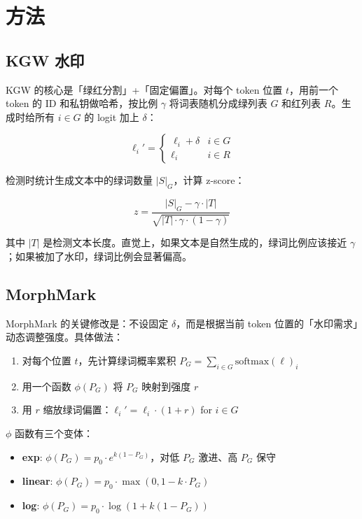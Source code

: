 \documentclass[11pt,a4paper]{article}
\begin{document}
\section{方法}

\subsection{KGW 水印}

KGW 的核心是「绿红分割」+「固定偏置」。对每个 token 位置 $t$，用前一个 token 的 ID 和私钥做哈希，按比例 $\gamma$ 将词表随机分成绿列表 $G$ 和红列表 $R$。生成时给所有 $i \in G$ 的 logit 加上 $\delta$：

\begin{equation}
\ell_i' = \begin{cases}
\ell_i + \delta & i \in G \\
\ell_i & i \in R
\end{cases}
\end{equation}

检测时统计生成文本中的绿词数量 $|S|_G$，计算 z-score：

\begin{equation}
z = \frac{|S|_G - \gamma \cdot |T|}{\sqrt{|T| \cdot \gamma \cdot (1-\gamma)}}
\end{equation}

其中 $|T|$ 是检测文本长度。直觉上，如果文本是自然生成的，绿词比例应该接近 $\gamma$；如果被加了水印，绿词比例会显著偏高。

\subsection{MorphMark}

MorphMark 的关键修改是：不设固定 $\delta$，而是根据当前 token 位置的「水印需求」动态调整强度。具体做法：

\begin{enumerate}[nosep]
  \item 对每个位置 $t$，先计算绿词概率累积 $P_G = \sum_{i \in G} \text{softmax}(\ell)_i$
  \item 用一个函数 $\phi(P_G)$ 将 $P_G$ 映射到强度 $r$
  \item 用 $r$ 缩放绿词偏置：$\ell_i' = \ell_i \cdot (1 + r)$ for $i \in G$
\end{enumerate}

$\phi$ 函数有三个变体：
\begin{itemize}[nosep]
  \item \textbf{exp}: $\phi(P_G) = p_0 \cdot e^{k(1-P_G)}$，对低 $P_G$ 激进、高 $P_G$ 保守
  \item \textbf{linear}: $\phi(P_G) = p_0 \cdot \max(0, 1 - k \cdot P_G)$
  \item \textbf{log}: $\phi(P_G) = p_0 \cdot \log(1 + k(1-P_G))$
\end{itemize}
\end{document}
